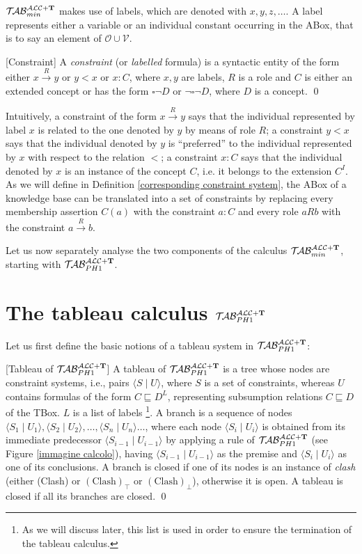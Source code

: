 \documentclass[a4paper, 11pt, oneside]{duthesis}
\newcommand{\tip}{{\bf T}}
\newcommand{\unione} {\cup}
\newcommand{\nott} {\lnot}
\newcommand{\tc} {\mid}
\newcommand{\bbox}{\square}
\newcommand{\sx} {\langle}
\newcommand{\dx} {\rangle}
\newcommand{\nuovoc}{\mathrel{{\mathcal{T}\!\mathcal{AB}}}_{min}^{\mathcal{ALC}+\mbox{\scriptsize $\tip$}}}
\newcommand{\primo}{\mathrel{{\mathcal{T}\!\mathcal{AB}}}_{PH 1}^{\mathcal{ALC}+\mbox{\scriptsize $\tip$}}}
\newcommand{\trans}[1]{\stackrel{#1}{\longrightarrow}}
\newenvironment{definition}
{\begin{defi} \rm}{\qed \end{defi}}
\newenvironment{definition}
{\begin{defi} \rm}{\qed \end{defi}}
\newtheorem{definition}{Definition}
\newcounter{posu}
\newtheorem{definition}[posu]{Definition}
\begin{document}
$\nuovoc$ makes use of labels, which are denoted with $x, y, z, \dots$.
A label represents either a variable or an individual constant occurring in the ABox, that is to say an element of $\mathcal{O} \unione \mathcal{V}$.

\begin{definition}[Constraint]
A \emph{constraint} (or \emph{labelled} formula) is a syntactic entity of the form either $x \trans{R} y$ or $y<x$ or $x: C$, where $x, y$ are labels, $R$ is a role and $C$ is either an extended concept or has the form $\bbox \nott D$ or $\nott \bbox \nott D$, where $D$ is a concept.
\end{definition}

\noindent Intuitively, a constraint of the form $x \trans{R} y$ says that the individual represented by label $x$ is related to the one denoted by $y$ by means of role $R$; a constraint $y<x$ says that the individual denoted by $y$ is ``preferred'' to the individual represented by $x$ with respect to the relation $<$; a constraint $x: C$ says that the individual denoted by $x$ is an instance of the concept $C$, i.e. it belongs to the extension $C^I$.
As we will define in Definition \ref{corresponding constraint system}, the ABox of a knowledge base can be translated into a set of constraints by replacing every membership assertion $C(a)$ with the constraint $a: C$ and every role $a R b$ with the constraint $a \trans{R} b$.

Let us now separately analyse the two components of the calculus $\nuovoc$, starting with $\primo$.

\section{The tableau calculus $\primo$}

Let us first define the basic notions of a tableau system in $\primo$:


\begin{definition}[Tableau of $\primo$]\label{deftableau}
A tableau of $\primo$ is a tree whose nodes are constraint systems, i.e., pairs $\sx S \tc U \dx$, where $S$ is a set of constraints, whereas $U$ contains formulas of the form $C \sqsubseteq D^L$, representing subsumption relations $C \sqsubseteq D$ of the TBox.
$L$ is a list of labels
\footnote{As we will discuss later, this list is used in order to ensure the termination of the tableau calculus.}.
A branch is a sequence of nodes $\sx S_1 \tc U_1 \dx, \sx S_2 \tc U_2 \dx, \dots, \sx S_n  \tc U_n \dx \dots$, where each node $\sx S_i \tc U_i \dx$ is obtained from its immediate predecessor $\sx S_{i-1} \tc U_{i-1} \dx$ by applying a rule of $\primo$ (see Figure \ref{immagine calcolo}), having $\sx S_{i-1} \tc U_{i-1} \dx$ as the premise and $\sx S_{i} \tc U_{i} \dx$ as one of its conclusions.
A branch is closed if one of its nodes is an instance of \emph{clash} (either (Clash) or $(\mbox{Clash})_\top$ or $(\mbox{Clash})_\bot$), otherwise it is open.
A tableau is closed if all its branches are closed.
\end{definition}
\end{document}
